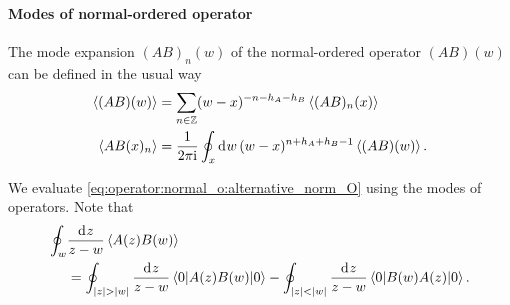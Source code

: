 \documentclass[10pt]{article}
\newcommand{\ii}{\mathrm{i}}
\begin{document}
\paragraph{Modes of normal-ordered operator}
The mode expansion $(AB)_n(w)$ of the normal-ordered operator $(AB)(w)$ can be defined in the usual way
\begin{subequations}
    \begin{align}
        \expval{(AB)(w)} & =\sum_{n\in\mathbb{Z}}(w-x)^{-n-h_A-h_B}\expval{(AB)_n(x)}             \\
        \expval{AB(x)_n} & =\frac{1}{2\pi\ii}\oint_x\dd[]{w} (w-x)^{n+h_A+h_B-1}\expval{(AB)(w)}.
    \end{align}
\end{subequations}

We evaluate \cref{eq:operator:normal_o:alternative_norm_O} using the modes of operators.
Note that
\begin{align}
    \oint_w & \frac{\dd[]{z}}{z-w}\expval{A(z)B(w)}\notag                                                                                                                                           \\
            & =\oint_{\abs{z}>\abs{w}}\frac{\dd[]{z}}{z-w}\ev**{A(z)B(w)}{0}-\oint_{\abs{z}<\abs{w}}\frac{\dd[]{z}}{z-w}\ev**{B(w)A(z)}{0}.\label{eq:operator:normal_o:alternative_norm_O_expanded}
\end{align}
\end{document}
